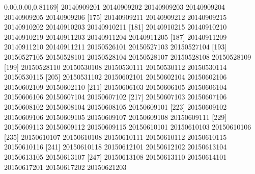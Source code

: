 \documentclass[
]{book}
\newenvironment{Shaded}{\begin{snugshade}}{\end{snugshade}}
\newcommand{\DecValTok}[1]{\textcolor[rgb]{0.00,0.00,0.81}{#1}}
\newcommand{\NormalTok}[1]{#1}
\begin{document}
\begin{Shaded}
\begin{Highlighting}[]
\NormalTok{[}\DecValTok{169}\NormalTok{] }\DecValTok{20140909201} \DecValTok{20140909202} \DecValTok{20140909203} \DecValTok{20140909204} \DecValTok{20140909205} \DecValTok{20140909206}
\NormalTok{[}\DecValTok{175}\NormalTok{] }\DecValTok{20140909211} \DecValTok{20140909212} \DecValTok{20140909215} \DecValTok{20140910202} \DecValTok{20140910203} \DecValTok{20140910211}
\NormalTok{[}\DecValTok{181}\NormalTok{] }\DecValTok{20140910215} \DecValTok{20140910210} \DecValTok{20140910219} \DecValTok{20140911203} \DecValTok{20140911204} \DecValTok{20140911205}
\NormalTok{[}\DecValTok{187}\NormalTok{] }\DecValTok{20140911209} \DecValTok{20140911210} \DecValTok{20140911211} \DecValTok{20150526101} \DecValTok{20150527103} \DecValTok{20150527104}
\NormalTok{[}\DecValTok{193}\NormalTok{] }\DecValTok{20150527105} \DecValTok{20150528101} \DecValTok{20150528104} \DecValTok{20150528107} \DecValTok{20150528108} \DecValTok{20150528109}
\NormalTok{[}\DecValTok{199}\NormalTok{] }\DecValTok{20150528110} \DecValTok{20150530108} \DecValTok{20150530111} \DecValTok{20150530112} \DecValTok{20150530114} \DecValTok{20150530115}
\NormalTok{[}\DecValTok{205}\NormalTok{] }\DecValTok{20150531102} \DecValTok{20150602101} \DecValTok{20150602104} \DecValTok{20150602106} \DecValTok{20150602109} \DecValTok{20150602110}
\NormalTok{[}\DecValTok{211}\NormalTok{] }\DecValTok{20150606103} \DecValTok{20150606105} \DecValTok{20150606104} \DecValTok{20150606106} \DecValTok{20150607104} \DecValTok{20150607102}
\NormalTok{[}\DecValTok{217}\NormalTok{] }\DecValTok{20150607103} \DecValTok{20150607106} \DecValTok{20150608102} \DecValTok{20150608104} \DecValTok{20150608105} \DecValTok{20150609101}
\NormalTok{[}\DecValTok{223}\NormalTok{] }\DecValTok{20150609102} \DecValTok{20150609106} \DecValTok{20150609105} \DecValTok{20150609107} \DecValTok{20150609108} \DecValTok{20150609111}
\NormalTok{[}\DecValTok{229}\NormalTok{] }\DecValTok{20150609113} \DecValTok{20150609112} \DecValTok{20150609115} \DecValTok{20150610101} \DecValTok{20150610103} \DecValTok{20150610106}
\NormalTok{[}\DecValTok{235}\NormalTok{] }\DecValTok{20150610107} \DecValTok{20150610108} \DecValTok{20150610111} \DecValTok{20150610112} \DecValTok{20150610115} \DecValTok{20150610116}
\NormalTok{[}\DecValTok{241}\NormalTok{] }\DecValTok{20150610118} \DecValTok{20150612101} \DecValTok{20150612102} \DecValTok{20150613104} \DecValTok{20150613105} \DecValTok{20150613107}
\NormalTok{[}\DecValTok{247}\NormalTok{] }\DecValTok{20150613108} \DecValTok{20150613110} \DecValTok{20150614101} \DecValTok{20150617201} \DecValTok{20150617202} \DecValTok{20150621203}

\end{Highlighting}
\end{Shaded}
\end{document}
